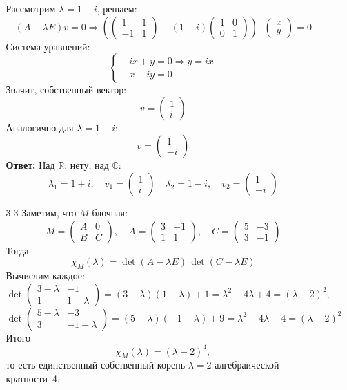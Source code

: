 \documentclass[a4paper]{article}
\newcommand{\RR}{\mathbb{R}}
\newcommand{\CC}{\mathbb{C}}
\begin{document}
\begin{enumerate}
\begin{enumerate}
    Рассмотрим \( \lambda = 1 + i \), решаем:
    \[
    (A - \lambda E)v = 0
    \Rightarrow
    \left(
    \begin{pmatrix}
    1 & 1 \\
    -1 & 1
    \end{pmatrix}
    -
    (1 + i)
    \begin{pmatrix}
    1 & 0 \\
    0 & 1
    \end{pmatrix}
    \right)
    \cdot
    \begin{pmatrix}
    x \\
    y
    \end{pmatrix}
    = 0
    \]
    Система уравнений:
    \[
    \begin{cases}
    -ix + y = 0 \Rightarrow y = ix \\
    - x - i y = 0
    \end{cases}
    \]
    Значит, собственный вектор:
    \[
    v = \begin{pmatrix} 1 \\ i \end{pmatrix}
    \]
    Аналогично для \( \lambda = 1 - i \):
    \[
    v = \begin{pmatrix} 1 \\ -i \end{pmatrix}
    \]
    \textbf{Ответ: } Над $\RR$: нету, над $\CC$:
    \[
    \lambda_1 = 1 + i,\quad v_1 = \begin{pmatrix} 1 \\ i \end{pmatrix}\quad
    \lambda_2 = 1 - i,\quad v_2 = \begin{pmatrix} 1 \\ -i \end{pmatrix}
    \]

    \item[3.3]Заметим, что \(M\) блочная:
    \[
    M=\begin{pmatrix}
    A & 0\\
    B & C
    \end{pmatrix},
    \quad
    A=\begin{pmatrix}3&-1\\1&1\end{pmatrix},
    \quad
    C=\begin{pmatrix}5&-3\\3&-1\end{pmatrix}
    \]
    Тогда
    \[
    \chi_M(\lambda)=\det(A-\lambda E)\,\det(C-\lambda E)
    \]
    Вычислим каждое:
    \[
    \det\!\begin{pmatrix}3-\lambda&-1\\1&1-\lambda\end{pmatrix}
    =(3-\lambda)(1-\lambda)+1
    =\lambda^2-4\lambda+4=(\lambda-2)^2,
    \]
    \[
    \det\!\begin{pmatrix}5-\lambda&-3\\3&-1-\lambda\end{pmatrix}
    =(5-\lambda)(-1-\lambda)+9
    =\lambda^2-4\lambda+4=(\lambda-2)^2
    \]
    Итого  
    \[
    \chi_M(\lambda)=(\lambda-2)^4,
    \]  
    то есть единственный собственный корень \(\lambda=2\) алгебраической кратности 4.


\end{enumerate}
\end{enumerate}
\end{document}
